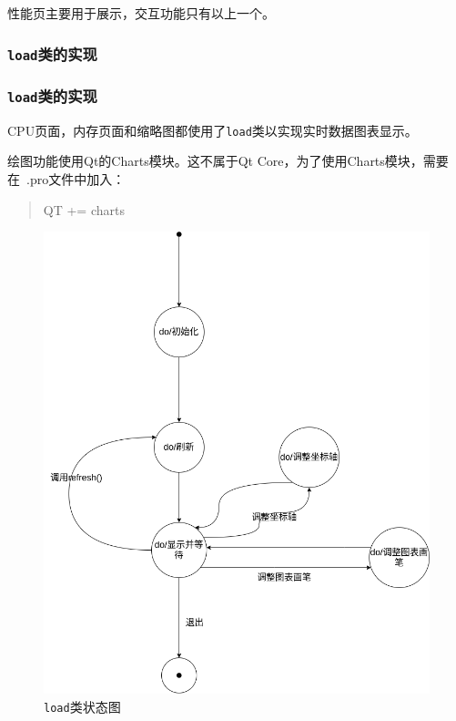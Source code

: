 \documentclass{beamer}
\newcommand\code[1]{\texttt{#1}}
\begin{document}
\begin{frame}
    性能页主要用于展示，交互功能只有以上一个。
\end{frame}

\subsubsection{\code{load}类的实现}
\begin{frame}
    \frametitle{\code{load}类的实现}
CPU页面，内存页面和缩略图都使用了\code{load}类以实现实时数据图表显示。

绘图功能使用Qt的Charts模块。这不属于Qt Core，为了使用Charts模块，需要在\ .pro文件中加入：

\begin{quote}
    \ttfamily
    QT += charts
\end{quote}
\end{frame}

\begin{frame}
    \begin{figure}
        \centering
        \includegraphics[scale=0.23]{../dia/load.png}
        \caption{\code{load}类状态图}
    \end{figure}
\end{frame}
\end{document}
